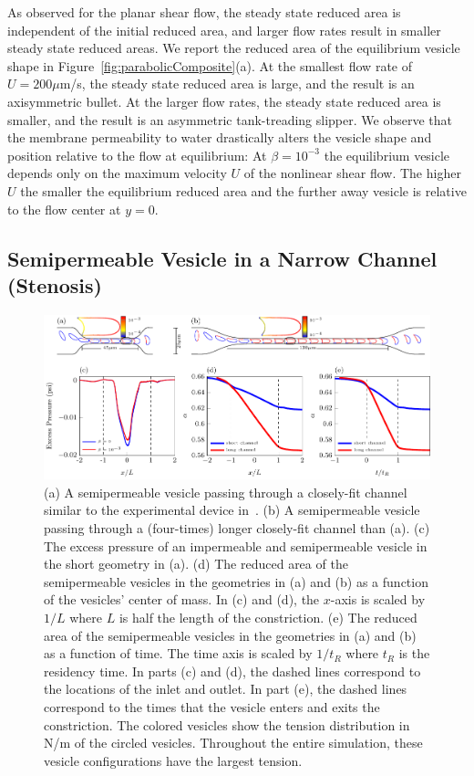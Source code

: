 \documentclass[9pt,twocolumn,twoside,lineno]{pnas-new}
\newif\ifTikz
\begin{document}
As observed for the planar shear flow, the steady state reduced area is
independent of the initial reduced area, and larger flow rates result in
smaller steady state reduced areas. We report the reduced area of the
equilibrium vesicle shape in Figure~\ref{fig:parabolicComposite}(a). At
the smallest flow rate of $U= 200 \mu$m/s, the steady state reduced
area is large, and the result is an axisymmetric bullet. At the larger
flow rates, the steady state reduced area is smaller, and the result is
an asymmetric tank-treading slipper. We observe that the membrane
permeability to water drastically alters the vesicle shape and position
relative to the flow at equilibrium: At $\beta=10^{-3}$ the equilibrium
vesicle depends only on the maximum velocity $U$ of the nonlinear shear
flow. The higher $U$ the smaller the equilibrium reduced area and the
further away vesicle is relative to the flow center at $y=0$. 
 
\subsection*{Semipermeable Vesicle in a Narrow Channel (Stenosis)}
 \begin{figure}[hbp]
  \centering
  \ifTikz
  
  \else
  \includegraphics{figures/stenosisComposite.pdf}
  \fi
  \caption{\label{fig:stenosisComposite} (a) A semipermeable vesicle
   passing through a closely-fit channel similar to the experimental
   device in~\cite{abk-fai-sto2006}. (b) A semipermeable vesicle passing
   through a  (four-times) longer closely-fit channel than (a). (c) The
   excess pressure of an impermeable and semipermeable vesicle in the
   short geometry in (a). (d) The reduced area of the semipermeable
   vesicles in the geometries in (a) and (b) as a function of the
   vesicles' center of mass. In (c) and (d), the $x$-axis is scaled by
   $1/L$ where $L$ is half the length of the constriction. (e) The
   reduced area of the semipermeable vesicles in the geometries in (a)
   and (b) as a function of time. The time axis is scaled by $1/t_R$
   where $t_R$ is the residency time. In parts (c) and (d), the dashed
   lines correspond to the locations of the inlet and outlet. In part
   (e), the dashed lines correspond to the times that the vesicle enters
   and exits the constriction. The colored vesicles show the tension
   distribution in N/m of the circled vesicles. Throughout the entire
   simulation, these vesicle configurations have the largest tension.}
\end{figure}
\end{document}
